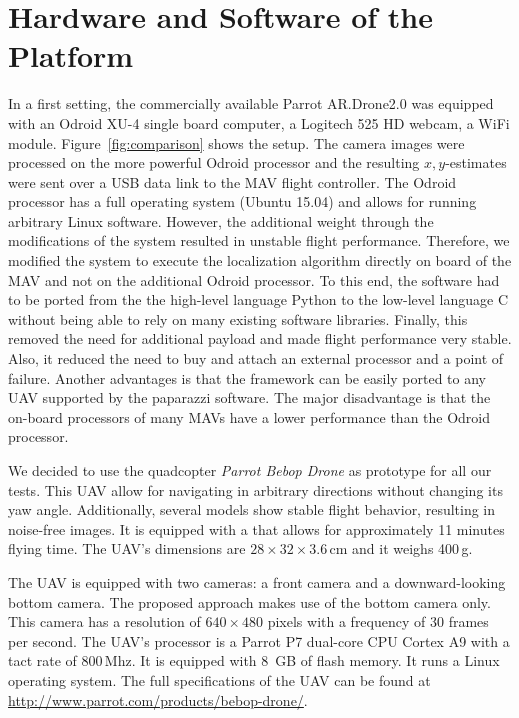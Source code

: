 \DeclareMathOperator*{\argmin}{arg\,min}
\DeclareMathOperator*{\argmax}{arg\,max}

\section{Hardware and Software of the Platform}
\label{sec:hardware}

In a first setting, the commercially available Parrot AR.Drone2.0 was
equipped with an Odroid XU-4 single board computer, a Logitech 525 HD
webcam, a WiFi module. Figure~\ref{fig:comparison} shows the setup. The camera images were processed on the more powerful Odroid processor and the resulting $x,y$-estimates were sent over a USB data link to the MAV flight controller. The Odroid processor has a full operating system (Ubuntu 15.04) and
allows for running arbitrary Linux software.
However, the additional weight through the modifications of the system resulted in unstable flight performance. Therefore, we modified the system to execute the localization algorithm directly on board of the MAV and not on the additional Odroid processor. To this end, the software had to be ported from the the high-level language
Python to the low-level language C without being able to rely on many
existing software libraries.
Finally, this removed the need for additional payload and made flight performance
very stable. Also, it reduced the need to buy and attach an external
processor and a point of failure. Another advantages is that the
framework can be easily ported to any UAV supported by the paparazzi
software. The major disadvantage is that the on-board processors of many
MAVs have a lower performance than the Odroid processor.

We decided to use the quadcopter \emph{Parrot Bebop Drone}
as prototype for all our tests. This UAV allow for navigating in
arbitrary directions without changing its yaw angle. Additionally,
several models show stable flight behavior, resulting in noise-free
images. It is equipped with a that allows for approximately 11 minutes
flying time. The UAV's dimensions are $28 \times 32 \times 3.6$\,cm
and it weighs 400\,g.

The UAV is equipped with two cameras: a front camera and a
downward-looking bottom camera. The proposed approach makes use of the
bottom camera only. This camera has a resolution of $640 \times 480$
pixels with a frequency of 30 frames per second. The UAV's processor
is a Parrot P7 dual-core CPU Cortex A9 with a tact rate of
800\,Mhz. It is equipped with 8~GB of flash memory. It runs a Linux
operating system. The full specifications of the UAV can be found at
\url{http://www.parrot.com/products/bebop-drone/}.

